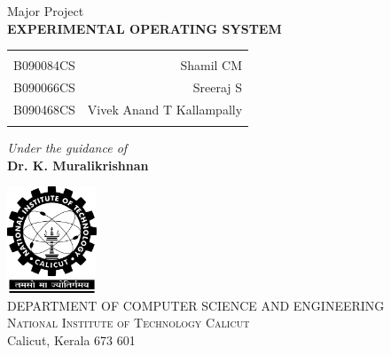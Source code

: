 \documentclass[10pt]{report}
\begin{document}
\begin{titlepage}

\begin{center}

\textup{\large Major Project}\\[1.0cm]

\uppercase{\Large \textbf {EXPERIMENTAL OPERATING SYSTEM}}\\[3.0cm]


\begin{table}[h]
\centering
\begin{tabular}{lr}\hline \\
B090084CS & Shamil CM \\
B090066CS & Sreeraj S \\ 
B090468CS & Vivek Anand T Kallampally \\ \\ \hline 
\end{tabular}
\end{table}

\vspace{2cm}

\large \textit{Under the guidance of} \\
\large \textbf{Dr. K. Muralikrishnan}

\vfill

\includegraphics[width=0.20\textwidth]{./nitc-logo}\\[1cm]
\large{DEPARTMENT OF COMPUTER SCIENCE AND ENGINEERING}\\
\normalsize
\textsc{National Institute of Technology Calicut}\\
Calicut, Kerala 673 601 \\
\vspace{0.5cm}


\end{center}

\end{titlepage}
%

\end{document}
